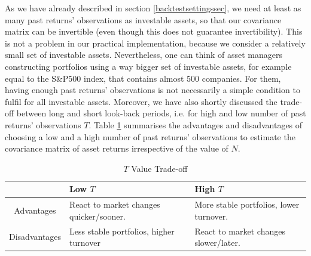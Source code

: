 	As we have already described in section \ref{backtestsettingssec}, we need at least as many past returns' observations as investable assets, so that our covariance matrix can be invertible (even though this does not guarantee invertibility). This is not a problem in our practical implementation, because we consider a relatively small set of investable assets. Nevertheless, one can think of asset managers constructing portfolios using a way bigger set of investable assets, for example equal to the S\&P500 index, that contains almost 500 companies. For them, having enough past returns' observations is not necessarily a simple condition to fulfil for all investable assets. Moreover, we have also shortly discussed the trade-off between long and short look-back periods, i.e. for high and low number of past returns' observations $T$. Table \ref{tab:tvaluetradeoff} summarises the advantages and disadvantages of choosing a low and a high number of past returns' observations to estimate the covariance matrix of asset returns irrespective of the value of $N$.
	
	

    \begin{table}[h!]
        \centering
        \begin{tabularx}{\textwidth}{c|XX}
             & \textbf{Low $T$} & \textbf{High $T$} \\
	         \hline
            Advantages & React to market changes quicker/sooner. & More stable portfolios, lower turnover. \\
            Disadvantages & Less stable portfolios, higher turnover & React to market changes slower/later.
        \end{tabularx}
        \caption{$T$ Value Trade-off}
	    \label{tab:tvaluetradeoff}
    \end{table} 
	

